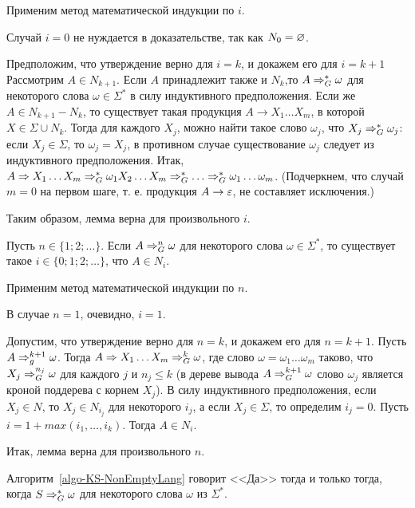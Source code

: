 \begin{myproof}
Применим метод математической индукции по $i$.

Случай $i=0$ не нуждается в доказательстве, так как $N_0=\varnothing$.

Предположим, что утверждение верно для $i=k$, и докажем его для $i=k+1$ Рассмотрим $A\in N_{k+1}$. Если $A$ принадлежит также и $N_k$,то $A\Rightarrow_G^*\omega$ для некоторого слова $\omega\in\Sigma^*$ в силу индуктивного предположения. Если же $A\in N_{k+1}-N_k$, то существует такая продукция $A\to X_1\ldots X_m$, в которой $X\in\Sigma\cup N_k$. Тогда для каждого $X_j$, можно найти такое слово $\omega_j$, что $X_j\Rightarrow_G^*\omega_j$: если $X_j\in\Sigma$, то $\omega_j=X_j$, в противном случае существование $\omega_j$ следует из индуктивного предположения. Итак, $A \Rightarrow X_1\ldots X_m \Rightarrow_G^*\omega_1X_2\ldots X_m \Rightarrow_G^* \ldots \Rightarrow_G^* \omega_1\ldots \omega_m$. (Подчеркнем, что случай $m=0$ на первом шаге, т. е. продукция $A\to \varepsilon$, не составляет исключения.)

Таким образом, лемма верна для произвольного $i$.
\end{myproof}

\begin{mylemma}
\label{lemma-NonEmptyAlgoCorr-2}
Пусть $n\in\{1;2;\ldots\}$. Если $A\Rightarrow_G^n\omega$ для некоторого слова $\omega\in\Sigma^*$, то существует такое $i\in\{0;1;2;\ldots\}$, что $A\in N_i$.
\end{mylemma}

\begin{myproof}
Применим метод математической индукции по $n$.

В случае $n=1$, очевидно, $i=1$.

Допустим, что утверждение верно для $n=k$, и докажем его для $n=k+1$. Пусть $A\Rightarrow_g^{k+1}\omega$. Тогда $A\Rightarrow X_1\ldots X_m\Rightarrow_G^k\omega$, где слово $\omega=\omega_1\ldots \omega_m$ таково, что $X_j\Rightarrow_G^{n_j}\omega$ для каждого $j$ и $n_j\le k$ (в дереве вывода $A\Rightarrow_G^{k+1}\omega$ слово $\omega_j$ является кроной поддерева с корнем $X_j$). В силу индуктивного предположения, если $X_j\in N$, то $X_j\in N_{i_j}$ для некоторого $i_j$, а если $X_j\in\Sigma$, то определим $i_j=0$. Пусть $i=1+max(i_1, \ldots , i_k)$. Тогда $A\in N_i$.

Итак, лемма верна для произвольного $n$.
\end{myproof}

\begin{mytheorem}
Алгоритм~\ref{algo-KS-NonEmptyLang} говорит <<Да>> тогда и только тогда, когда $S\Rightarrow_G^*\omega$ для некоторого слова $\omega$ из $\Sigma^*$.
\end{mytheorem}

